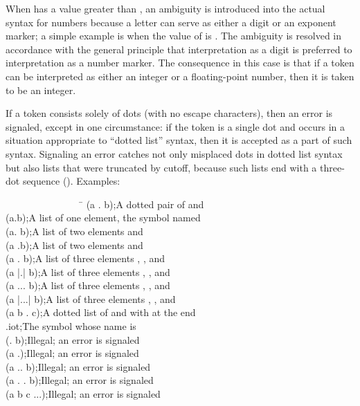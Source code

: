 When  has a value greater than , an ambiguity
is introduced into the actual syntax for numbers because a letter can serve
as either a digit or an exponent marker; a simple example is 
when the value of  is .  The ambiguity is resolved
in accordance with the general principle that interpretation
as a digit is preferred to interpretation as a number marker.
The consequence in this case is that
if a token can be interpreted as either an integer or a floating-point
number, then it is taken to be an integer.

If a token consists solely of dots (with no escape characters), then an
error is signaled, except in one circumstance: if the token is a single
dot and occurs in a situation appropriate to ``dotted list'' syntax,
then it is accepted as a part of such syntax.  Signaling an error
catches not only misplaced dots in dotted list syntax but also
lists that were truncated by  cutoff,
because such lists end with a three-dot sequence ().
Examples:
\begin{lisp}
~~~~~~~~~~~~~~~~\=\kill
(a . b)\>;\textrm{A dotted pair of  and } \\
(a.b)\>;\textrm{A list of one element, the symbol named } \\
(a. b)\>;\textrm{A list of two elements  and } \\
(a .b)\>;\textrm{A list of two elements  and } \\
(a {\Xbackslash}. b)\>;\textrm{A list of three elements , , and } \\
(a |.| b)\>;\textrm{A list of three elements , , and } \\
(a {\Xbackslash}... b)\>;\textrm{A list of three elements , , and } \\
(a |...| b)\>;\textrm{A list of three elements , , and } \\
(a b . c)\>;\textrm{A dotted list of  and  with  at the end} \\
.iot\>;\textrm{The symbol whose name is } \\
(. b)\>;\textrm{Illegal; an error is signaled} \\
(a .)\>;\textrm{Illegal; an error is signaled} \\
(a .. b)\>;\textrm{Illegal; an error is signaled} \\
(a . . b)\>;\textrm{Illegal; an error is signaled} \\
(a b c ...)\>;\textrm{Illegal; an error is signaled}
\end{lisp}

